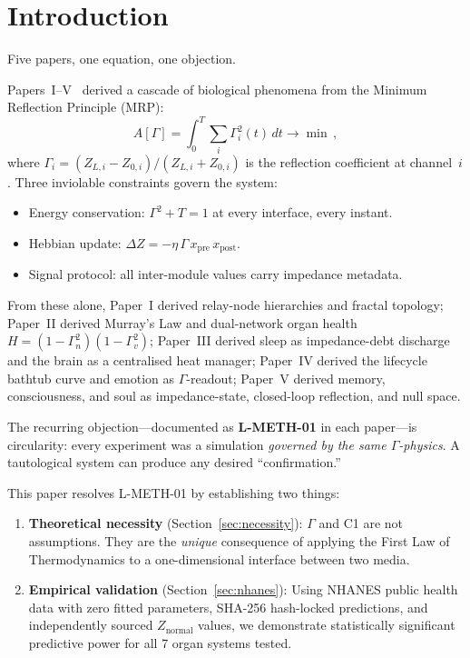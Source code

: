 \documentclass[aps,pre,twocolumn,superscriptaddress,floatfix]{revtex4-2}
\begin{document}
\maketitle


\section{Introduction}
\label{sec:intro}

Five papers, one equation, one objection.

Papers~I--V~\cite{PaperI,PaperII,PaperIII,PaperIV,PaperV}
derived a cascade of biological phenomena from the
Minimum Reflection Principle (MRP):
\begin{equation}
  A[\Gamma] = \int_0^T \sum_i \Gamma_i^2(t)\,dt \to \min\,,
  \label{eq:MRP}
\end{equation}
where $\Gamma_i=(Z_{L,i}-Z_{0,i})/(Z_{L,i}+Z_{0,i})$ is
the reflection coefficient at channel~$i$.
Three inviolable constraints govern the system:
\begin{itemize}
  \item[\textbf{C1}] Energy conservation:
    $\Gamma^2+T=1$ at every interface, every instant.
  \item[\textbf{C2}] Hebbian update:
    $\Delta Z=-\eta\,\Gamma\,x_{\text{pre}}\,x_{\text{post}}$.
  \item[\textbf{C3}] Signal protocol: all inter-module values
    carry impedance metadata.
\end{itemize}
From these alone, Paper~I derived relay-node hierarchies
and fractal topology;
Paper~II derived Murray's Law and dual-network organ health
$H=(1-\Gamma_n^2)(1-\Gamma_v^2)$;
Paper~III derived sleep as impedance-debt discharge and
the brain as a centralised heat manager;
Paper~IV derived the lifecycle bathtub curve and
emotion as $\Gamma$-readout;
Paper~V derived memory, consciousness, and soul as
impedance-state, closed-loop reflection, and null space.

The recurring objection---documented as \textbf{L-METH-01}
in each paper---is circularity:
every experiment was a simulation \emph{governed by the same
$\Gamma$-physics}.  A tautological system can produce any
desired ``confirmation.''

This paper resolves L-METH-01 by establishing two things:

\begin{enumerate}
  \item \textbf{Theoretical necessity} (Section~\ref{sec:necessity}):
    $\Gamma$ and C1 are not assumptions.
    They are the \emph{unique} consequence of applying the
    First Law of Thermodynamics to a one-dimensional
    interface between two media.
  \item \textbf{Empirical validation} (Section~\ref{sec:nhanes}):
    Using NHANES public health data with zero fitted
    parameters, SHA-256 hash-locked predictions, and
    independently sourced $Z_{\text{normal}}$ values,
    we demonstrate statistically significant predictive
    power for all 7 organ systems tested.
\end{enumerate}
\end{document}
